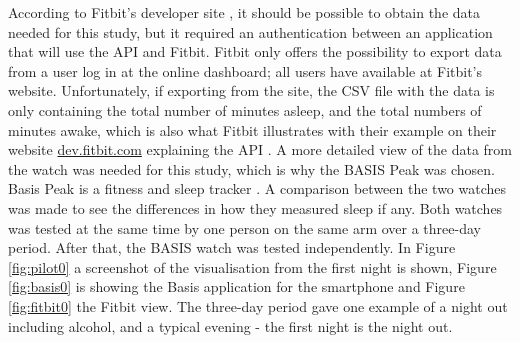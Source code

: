 \documentclass[12pt]{article} %
\begin{document}
According to Fitbit's developer site \cite{fitbit_dev}, it should be possible to obtain the data needed for this study, but it required an authentication between an application that will use the API and Fitbit. Fitbit only offers the possibility to export data from a user log in at the online dashboard; all users have available at Fitbit's website. Unfortunately, if exporting from the site, the CSV file with the data is only containing the total number of minutes asleep, and the total numbers of minutes awake, which is also what Fitbit illustrates with their example on their website \url{dev.fitbit.com} explaining the API \cite{fitbit_dev}. A more detailed view of the data from the watch was needed for this study, which is why the BASIS Peak was chosen.\\

Basis Peak is a fitness and sleep tracker \cite{basis}. A comparison between the two watches was made to see the differences in how they measured sleep if any. Both watches was tested at the same time by one person on the same arm over a three-day period. After that, the BASIS watch was tested independently. In Figure \ref{fig:pilot0} a screenshot of the visualisation from the first night is shown, Figure \ref{fig:basis0} is showing the Basis application for the smartphone and Figure \ref{fig:fitbit0} the Fitbit view. The three-day period gave one example of a night out including alcohol, and a typical evening - the first night is the night out. 
\end{document}
